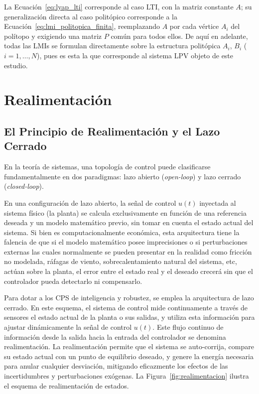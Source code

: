 La Ecuación~\eqref{eq:lyap_lti} corresponde al caso LTI, con la matriz constante $A$; su generalización directa al caso politópico corresponde a la Ecuación~\eqref{eq:lmi_politopica_finita}, reemplazando $A$ por cada vértice $A_i$ del polítopo y exigiendo una matriz $P$ común para todos ellos. De aquí en adelante, todas las LMIs se formulan directamente sobre la estructura politópica $A_i$, $B_i$ ($i=1,\dots,N$), pues es esta la que corresponde al sistema LPV objeto de este estudio.


















\section{Realimentación}
\label{sec:lazo_cerrado}


\subsection{El Principio de Realimentación y el Lazo Cerrado}

En la teoría de sistemas, una topología de control puede clasificarse fundamentalmente en dos paradigmas: lazo abierto (\textit{open-loop}) y lazo cerrado (\textit{closed-loop}). 

En una configuración de lazo abierto, la señal de control $u(t)$ inyectada al sistema físico (la planta) se calcula exclusivamente en función de una referencia deseada y un modelo matemático previo, sin tomar en cuenta el estado actual del sistema. Si bien es computacionalmente económica, esta arquitectura tiene la falencia de que si el modelo matemático posee imprecisiones o si perturbaciones externas las cuales normalmente se pueden presentar en la realidad como fricción no modelada, ráfagas de viento, sobrecalentamiento natural del sistema, etc, actúan sobre la planta, el error entre el estado real y el deseado crecerá sin que el controlador pueda detectarlo ni compensarlo.

Para dotar a los CPS de inteligencia y robustez, se emplea la arquitectura de lazo cerrado. En este esquema, el sistema de control mide continuamente a través de sensores el estado actual de la planta o sus salidas, y utiliza esta información para ajustar dinámicamente la señal de control $u(t)$. Este flujo continuo de información desde la salida hacia la entrada del controlador se denomina realimentación. La realimentación permite que el sistema se auto-corrija, compare su estado actual con un punto de equilibrio deseado, y genere la energía necesaria para anular cualquier desviación, mitigando eficazmente los efectos de las incertidumbres y perturbaciones exógenas. La Figura~\ref{fig:realimentacion} ilustra el esquema de realimentación de estados.


